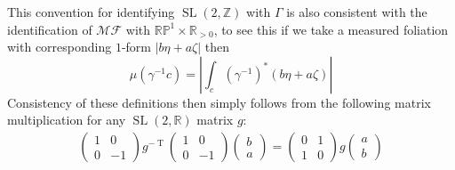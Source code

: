 \documentclass{article}
\newcommand{\abs}[1]{\left\vert#1\right\vert}
\newcommand{\slr}{\operatorname{SL}(2,\mathbb{R})}
\newcommand{\slz}{\operatorname{SL}(2,\mathbb{Z})}
\begin{document}
        This convention for identifying \(\slz\) with \(\Gamma\) is also consistent with the identification of \(\mathscr{MF}\) with \(\mathbb{RP}^1 \times \mathbb{R}_{>0}\), to see this if we take a measured foliation with corresponding \(1\)-form \(\abs{b\eta + a\zeta}\) then \[\mu(\gamma^{-1}c) = \abs{\int_c (\gamma^{-1})^*(b\eta + a\zeta)}\]
        Consistency of these definitions then simply follows from the following matrix multiplication for any \(\slr\) matrix \(g\):
        \begin{align*}
            \begin{pmatrix} 1 & 0 \\ 0 & -1 \end{pmatrix} g^{-\operatorname{T}} \begin{pmatrix} 1 & 0 \\ 0 & -1 \end{pmatrix} \begin{pmatrix} b \\ a \end{pmatrix} = \begin{pmatrix} 0 & 1 \\ 1 & 0 \end{pmatrix} g \begin{pmatrix} a \\ b \end{pmatrix}
        \end{align*}
\end{document}
